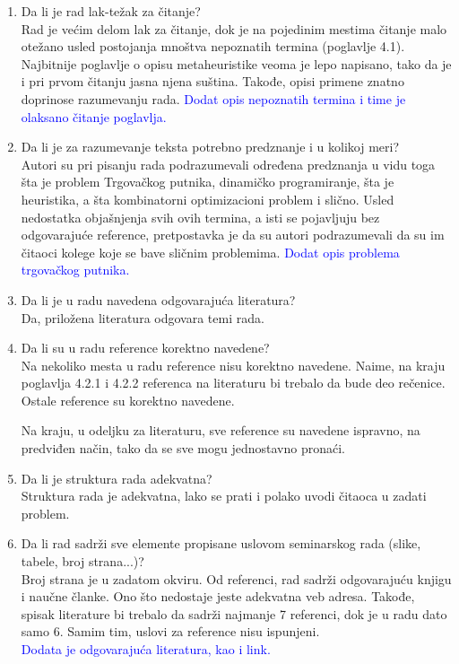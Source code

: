 \documentclass[a4paper]{report}
\newcommand{\odgovor}[1]{\textcolor{blue}{#1}}
\begin{document}
\begin{enumerate}
\item Da li je rad lak-težak za čitanje?\\
Rad je većim delom lak za čitanje, dok je na pojedinim mestima čitanje malo otežano usled postojanja mnoštva nepoznatih termina (poglavlje 4.1). Najbitnije poglavlje o opisu metaheuristike veoma je lepo napisano, tako da je i pri prvom čitanju jasna njena suština. Takođe, opisi primene znatno doprinose razumevanju rada.
\odgovor{Dodat opis nepoznatih termina i time je olaksano čitanje poglavlja.\\}
\item Da li je za razumevanje teksta potrebno predznanje i u kolikoj meri?\\
Autori su pri pisanju rada podrazumevali određena predznanja u vidu toga šta je problem Trgovačkog putnika, dinamičko programiranje, šta je heuristika, a šta kombinatorni optimizacioni problem i slično. Usled nedostatka objašnjenja svih ovih termina, a isti se pojavljuju bez odgovarajuće reference, pretpostavka je da su autori podrazumevali da su im čitaoci kolege koje se bave sličnim problemima.
\odgovor{Dodat opis problema trgovačkog putnika.\\} 
\item Da li je u radu navedena odgovarajuća literatura?\\
Da, priložena literatura odgovara temi rada.

\item Da li su u radu reference korektno navedene?\\
Na nekoliko mesta u radu reference nisu korektno navedene. Naime, na kraju poglavlja 4.2.1 i 4.2.2 referenca na literaturu bi trebalo da bude deo rečenice. Ostale reference su korektno navedene. 

Na kraju, u odeljku za literaturu, sve reference su navedene ispravno, na predviđen način, tako da se sve mogu jednostavno pronaći.

\item Da li je struktura rada adekvatna?\\
Struktura rada je adekvatna, lako se prati i polako uvodi čitaoca u zadati problem.

\item Da li rad sadrži sve elemente propisane uslovom seminarskog rada (slike, tabele, broj strana...)?\\
Broj strana je u zadatom okviru. Od referenci, rad sadrži odgovarajuću knjigu i naučne članke. Ono što nedostaje jeste adekvatna veb adresa. Takođe, spisak literature bi trebalo da sadrži najmanje 7 referenci, dok je u radu dato samo 6. Samim tim, uslovi za reference nisu ispunjeni.\\
\odgovor{Dodata je odgovarajuća literatura, kao i link.}


\end{enumerate}
\end{document}
